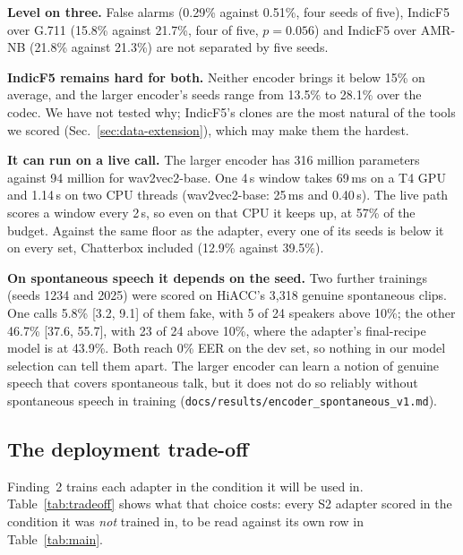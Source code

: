 \textbf{Level on three.} False alarms (0.29\% against 0.51\%, four seeds of five), IndicF5
over G.711 (15.8\% against 21.7\%, four of five, $p = 0.056$) and IndicF5 over AMR-NB (21.8\%
against 21.3\%) are not separated by five seeds.

\textbf{IndicF5 remains hard for both.} Neither encoder brings it below 15\% on average, and
the larger encoder's seeds range from 13.5\% to 28.1\% over the codec. We have not tested
why; IndicF5's clones are the most natural of the tools we scored
(Sec.~\ref{sec:data-extension}), which may make them the hardest.

\textbf{It can run on a live call.} The larger encoder has 316 million parameters against
94 million for wav2vec2-base. One 4\,s window takes 69\,ms on a T4 GPU and 1.14\,s on two
CPU threads (wav2vec2-base: 25\,ms and 0.40\,s). The live path scores a window every 2\,s,
so even on that CPU it keeps up, at 57\% of the budget. Against the same floor as the
adapter, every one of its seeds is below it on every set, Chatterbox included (12.9\%
against 39.5\%).

\textbf{On spontaneous speech it depends on the seed.} Two further trainings (seeds 1234
and 2025) were scored on HiACC's 3{,}318 genuine spontaneous clips. One calls 5.8\%
{\scriptsize[3.2, 9.1]} of them fake, with 5 of 24 speakers above 10\%; the other 46.7\%
{\scriptsize[37.6, 55.7]}, with 23 of 24 above 10\%, where the adapter's final-recipe model
is at 43.9\%. Both reach 0\% EER on the dev set, so nothing in our model selection can tell
them apart. The larger encoder can learn a notion of genuine speech that covers spontaneous
talk, but it does not do so reliably without spontaneous speech in training
(\texttt{docs/results/encoder\_spontaneous\_v1.md}).

\subsection{The deployment trade-off}
\label{sec:tradeoff}

Finding~2 trains each adapter in the condition it will be used in.
Table~\ref{tab:tradeoff} shows what that choice costs: every S2 adapter scored in the
condition it was \emph{not} trained in, to be read against its own row in
Table~\ref{tab:main}.

